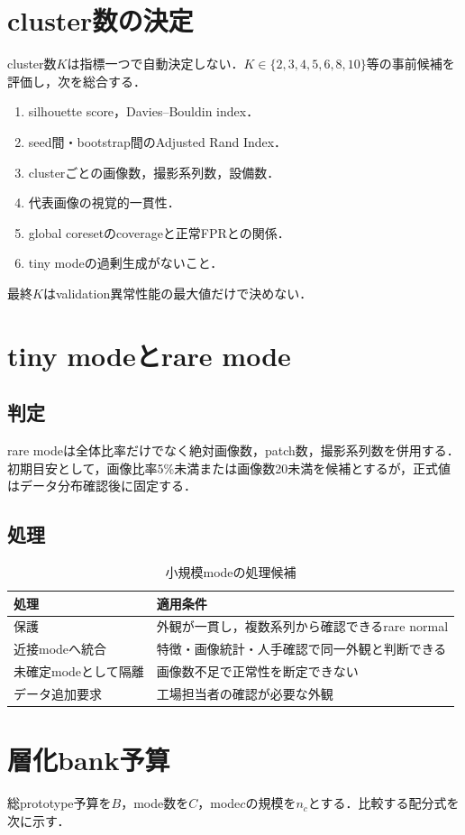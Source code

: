 \documentclass[a4paper,11pt]{ltjsarticle}
\begin{document}
\section{cluster数の決定}
cluster数$K$は指標一つで自動決定しない．$K\in\{2,3,4,5,6,8,10\}$等の事前候補を評価し，次を総合する．
\begin{enumerate}
  \item silhouette score，Davies--Bouldin index．
  \item seed間・bootstrap間のAdjusted Rand Index．
  \item clusterごとの画像数，撮影系列数，設備数．
  \item 代表画像の視覚的一貫性．
  \item global coresetのcoverageと正常FPRとの関係．
  \item tiny modeの過剰生成がないこと．
\end{enumerate}
最終$K$はvalidation異常性能の最大値だけで決めない．

\section{tiny modeとrare mode}
\subsection{判定}
rare modeは全体比率だけでなく絶対画像数，patch数，撮影系列数を併用する．初期目安として，画像比率5\%未満または画像数20未満を候補とするが，正式値はデータ分布確認後に固定する．

\subsection{処理}
\begin{table}[H]
\centering
\caption{小規模modeの処理候補}
\begin{tabularx}{\linewidth}{L{38mm}Y}
\toprule
処理 & 適用条件 \\
\midrule
保護 & 外観が一貫し，複数系列から確認できるrare normal \\
近接modeへ統合 & 特徴・画像統計・人手確認で同一外観と判断できる \\
未確定modeとして隔離 & 画像数不足で正常性を断定できない \\
データ追加要求 & 工場担当者の確認が必要な外観 \\
\bottomrule
\end{tabularx}
\end{table}

\section{層化bank予算}
総prototype予算を$B$，mode数を$C$，mode$c$の規模を$n_c$とする．比較する配分式を次に示す．
\end{document}
